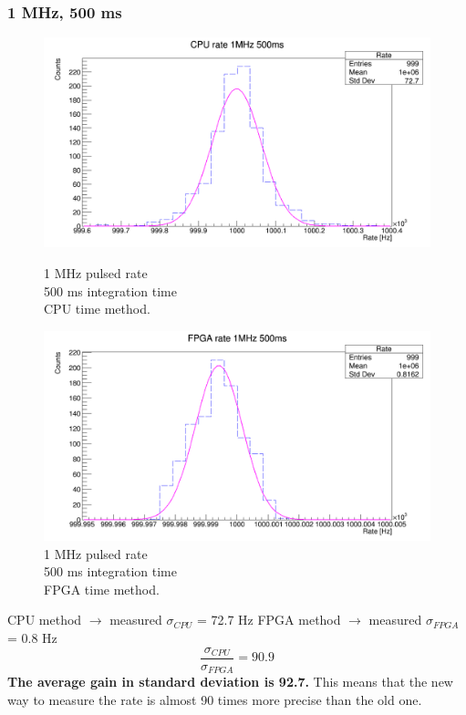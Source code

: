 \subsubsection{1 MHz, 500 ms}
\begin{figure}[H]
	\centering
	\begin{minipage}{0.49\textwidth}
		\centering
		\includegraphics[width=.99\linewidth]{IMG/ch5/RateMeasures/CPU-time-rate-1MHz-500ms}
		\caption{1 MHz pulsed rate\\500 ms integration time\\CPU time method.}
		\label{fig:CPU-time-rate-1MHz-500ms}
	\end{minipage}%
	\begin{minipage}{0.49\textwidth}
		\centering
		\includegraphics[width=.99\linewidth]{IMG/ch5/RateMeasures/FPGA-time-rate-1MHz-500ms}
		\caption{1 MHz pulsed rate\\500 ms integration time\\FPGA time method.}
		\label{fig:FPGA-time-rate-1MHz-500ms}
	\end{minipage}
\end{figure}
\noindent CPU method $\rightarrow$ measured $\sigma_{CPU}$ = 72.7 Hz
\newline
FPGA method $\rightarrow$ measured $\sigma_{FPGA}$ = 0.8 Hz
\begin{equation}
	\frac{\sigma_{CPU}}{\sigma_{FPGA}} = 90.9
\end{equation}
\newline
\noindent \textbf{The average gain in standard deviation is 92.7.}
\newline
This means that the new way to measure the rate is almost 90 times more precise than the old one.

